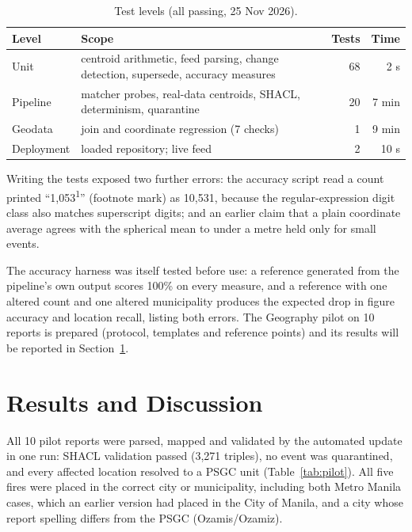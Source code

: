 \documentclass[acmtog]{acmart}
\begin{document}
\begin{table}[t]
  \caption{Test levels (all passing, 25 Nov 2026).}
  \label{tab:tests}
  \small
  \begin{tabular}{p{1.6cm}p{4.2cm}rr}
    \toprule
    Level & Scope & Tests & Time \\
    \midrule
    Unit & centroid arithmetic, feed parsing, change detection, supersede, accuracy measures & 68 & 2 s \\
    Pipeline & matcher probes, real-data centroids, SHACL, determinism, quarantine & 20 & 7 min \\
    Geodata & join and coordinate regression (7 checks) & 1 & 9 min \\
    Deployment & loaded repository; live feed & 2 & 10 s \\
    \bottomrule
  \end{tabular}
\end{table}

Writing the tests exposed two further errors: the accuracy script read a count printed
``1,053\textsuperscript{1}'' (footnote mark) as 10,531, because the regular-expression digit class
also matches superscript digits; and an earlier claim that a plain coordinate average agrees with
the spherical mean to under a metre held only for small events.

The accuracy harness was itself tested before use: a reference generated from the pipeline's own
output scores 100\% on every measure, and a reference with one altered count and one altered
municipality produces the expected drop in figure accuracy and location recall, listing both
errors. The Geography pilot on 10 reports is prepared (protocol, templates and reference points)
and its results will be reported in Section~\ref{sec:results}.

\section{Results and Discussion}
\label{sec:results}


All 10 pilot reports were parsed, mapped and validated by the automated update in one run:
SHACL validation passed (3,271 triples), no event was quarantined, and every affected location
resolved to a PSGC unit (Table~\ref{tab:pilot}). All five fires were placed in the correct city or
municipality, including both Metro Manila cases, which an earlier version had placed in the City of
Manila, and a city whose report spelling differs from the PSGC (Ozamis/Ozamiz).
\end{document}
